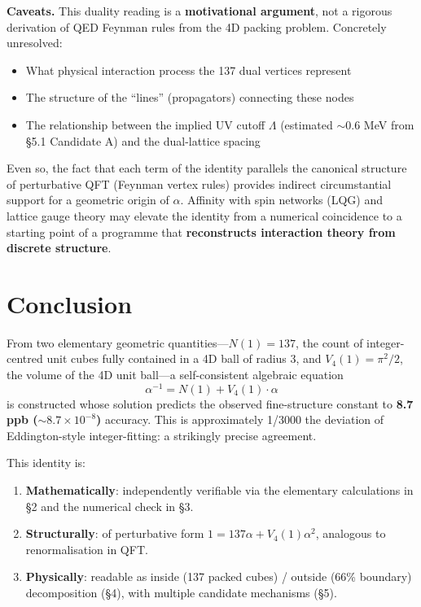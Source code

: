 \documentclass[a4paper,11pt]{article}
\begin{document}
\textbf{Caveats.} This duality reading is a \textbf{motivational argument}, not a rigorous derivation of QED Feynman rules from the 4D packing problem. Concretely unresolved:

\begin{itemize}
\item What physical interaction process the 137 dual vertices represent
\item The structure of the ``lines'' (propagators) connecting these nodes
\item The relationship between the implied UV cutoff $\Lambda$ (estimated $\sim 0.6$ MeV from §5.1 Candidate A) and the dual-lattice spacing
\end{itemize}

Even so, the fact that each term of the identity parallels the canonical structure of perturbative QFT (Feynman vertex rules) provides indirect circumstantial support for a geometric origin of $\alpha$. Affinity with spin networks (LQG) and lattice gauge theory may elevate the identity from a numerical coincidence to a starting point of a programme that \textbf{reconstructs interaction theory from discrete structure}.

\section{Conclusion}

From two elementary geometric quantities---$N(1) = 137$, the count of integer-centred unit cubes fully contained in a 4D ball of radius 3, and $V_4(1) = \pi^2/2$, the volume of the 4D unit ball---a self-consistent algebraic equation
\[ \alpha^{-1} = N(1) + V_4(1) \cdot \alpha \]
is constructed whose solution predicts the observed fine-structure constant to \textbf{8.7 ppb ($\sim 8.7 \times 10^{-8}$)} accuracy. This is approximately 1/3000 the deviation of Eddington-style integer-fitting: a strikingly precise agreement.

This identity is:

\begin{enumerate}
\item \textbf{Mathematically}: independently verifiable via the elementary calculations in §2 and the numerical check in §3.
\item \textbf{Structurally}: of perturbative form $1 = 137\alpha + V_4(1)\alpha^2$, analogous to renormalisation in QFT.
\item \textbf{Physically}: readable as inside (137 packed cubes) / outside (66\% boundary) decomposition (§4), with multiple candidate mechanisms (§5).
\end{enumerate}
\end{document}
